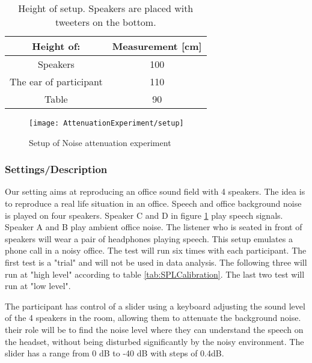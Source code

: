 \begin{table} [h]
	\centering
	\begin{tabular}{c c} \toprule
		\centering
		Height of:			 			& Measurement [cm] 	\\ \bottomrule
		Speakers					  	& 100				\\
		The ear of participant			& 110				\\ 
		Table							& 90				\\ \bottomrule 
	\end{tabular}
	\caption{Height of setup. Speakers are placed with tweeters on the bottom.}
	\label{Tab:NoiseAttenuationDimensions}
\end{table}

\begin{figure}[H]
	\centering
	\texttt{[image: AttenuationExperiment/setup]}
	\caption{Setup of Noise attenuation experiment}
	\label{Fig:NoiseAttenuationExperimet}
\end{figure}


\subsubsection{Settings/Description}
Our setting aims at reproducing an office sound field with 4 speakers. 
The idea is to reproduce a real life situation in an office. Speech and office background noise is played on four speakers. Speaker C and D in figure \ref{Fig:NoiseAttenuationExperimet} play speech signals. Speaker A and B play ambient office noise. The listener who is seated in front of speakers will wear a pair of headphones playing speech. This setup emulates a phone call in a noisy office. The test will run six times with each participant. The first test is a "trial" and will not be used in data analysis. The following three will run at "high level" according to table \ref{tab:SPLCalibration}. The last two test will run at "low level". 

The participant has control of a slider using a keyboard adjusting the sound level of the 4 speakers in the room, allowing them to attenuate the background noise. their role will be to find the noise level where they can understand the speech on the headset, without being disturbed significantly by the noisy environment. The slider has a range from 0 dB to -40 dB with steps of 0.4dB. 


